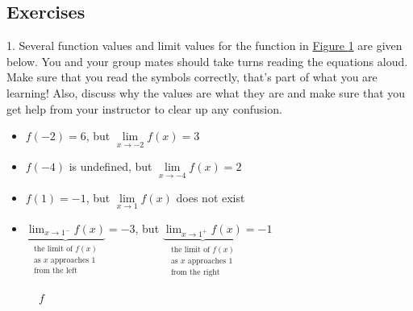 \documentclass[10pt,oneside,]{book}
\theoremstyle{plain}
\theoremstyle{definition}
\numberwithin{equation}{section}
\newcommand{\fe}[2]{#1\mathopen{}\left(#2\right)\mathclose{}}
\begin{document}
\subsection[Exercises]{Exercises}\label{exercises-5}
\begin{exerciselist}
\item[1.]\hypertarget{exercise-46}{\null}Several function values and limit values for the function in \hyperref[figure-first-limit]{Figure \ref{figure-first-limit}} are given below. You and your group mates should take turns reading the equations aloud. Make sure that you read the symbols correctly, that's part of what you are learning! Also, discuss why the values are what they are and make sure that you get help from your instructor to clear up any confusion.%
\begin{itemize}[label=\textbullet]
\item{}\(\fe{f}{-2}=6\), but \(\lim\limits_{x\to-2}\fe{f}{x}=3\)\item{}\(\fe{f}{-4}\) is undefined, but \(\lim\limits_{x\to-4}\fe{f}{x}=2\)\item{}\(\fe{f}{1}=-1\), but \(\lim\limits_{x\to1}\fe{f}{x}\) does not exist\item{}\(\underbrace{\lim_{x\to1^{-}}\fe{f}{x}}_{\begin{array}{c}\text{the limit of }\fe{f}{x}\\\text{as }x\text{ approaches }1\\\text{from the left}\end{array}}=-3\), but \(\underbrace{\lim_{x\to1^{+}}\fe{f}{x}}_{\begin{array}{c}\text{the limit of }\fe{f}{x}\\\text{as }x\text{ approaches }1\\\text{from the right}\end{array}}=-1\)\end{itemize}
\begin{figure}
\centering
{
}
\caption{\(f\)\label{figure-first-limit}}
\end{figure}
\par\smallskip
\end{exerciselist}
\end{document}
